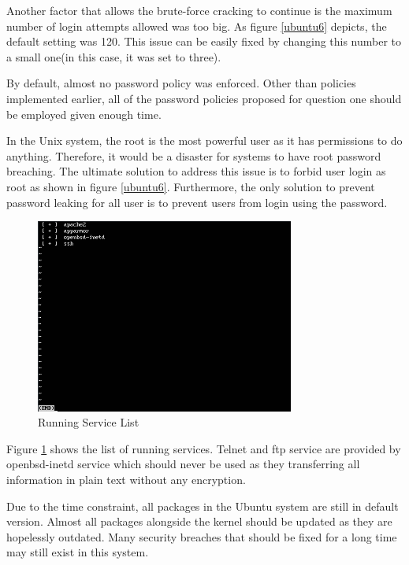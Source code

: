 \documentclass{article}
\begin{document}
Another factor that allows the brute-force cracking to continue is the maximum number of login attempts allowed 
was too big. As figure \ref{ubuntu6} depicts, the default setting was 120. This issue can be easily fixed by changing 
this number to a small one(in this case, it was set to three).

By default, almost no password policy was enforced. Other than policies implemented earlier, all of the password policies 
proposed for question one should be employed given enough time.

In the Unix system, the root is the most powerful user as it has permissions to do anything. Therefore, it would be a disaster for 
systems to have root password breaching. The ultimate solution to address this issue is to forbid user login as root 
as shown in figure \ref{ubuntu6}. Furthermore, the only solution to prevent password leaking for all user is to 
prevent users from login using the password.

\begin{figure}[H]
  \includegraphics[width=8.5cm]{ubuntu3}
  \caption{Running Service List}
  \label{ubuntu3}
\end{figure}
Figure \ref{ubuntu3} shows the list of running services. Telnet and ftp service are provided by openbsd-inetd service 
which should never be used as they transferring all information in plain text without any encryption.

Due to the time constraint, all packages in the Ubuntu system are still in default version. Almost all packages 
alongside the kernel should be updated as they are hopelessly outdated. Many security breaches that should be fixed 
for a long time may still exist in this system.




\vfill
\pagebreak

\vfill
\pagebreak



\end{document}
